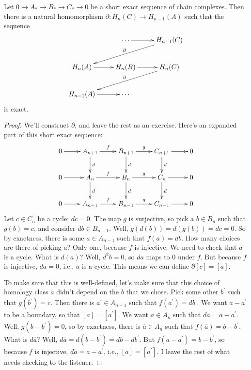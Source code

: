 \begin{theorem}
Let $0\to A_\ast\to B_\ast\to C_\ast\to 0$ be a short exact sequence of chain complexes. Then there is a natural homomorphism $\partial: H_n(C)\to H_{n-1}(A)$ such that the sequence 
\begin{equation*}
\xymatrix{ & \cdots \ar[r] & H_{n+1}(C) \ar[dll]_\partial \\
 H_n(A)\ar[r] & H_n(B)\ar[r] & H_n(C)\ar[dll]_\partial\\
 H_{n-1}(A)\ar[r] & \cdots & }
\end{equation*}
is exact.
\end{theorem}
\begin{proof}
We'll construct $\partial$, and leave the rest as an exercise. Here's an 
expanded part of this short exact sequence:
\begin{equation*}
\xymatrix{0\ar[r] & A_{n+1}\ar[r]^f\ar[d]^d & B_{n+1}\ar[r]^g\ar[d]^d & C_{n+1}\ar[r]\ar[d]^d & 0\\
0\ar[r] & A_n\ar[r]^f\ar[d]^d & B_n\ar[r]^g\ar[d]^d & C_n\ar[r]\ar[d]^d & 0\\
0\ar[r] & A_{n-1}\ar[r]^f & B_{n-1}\ar[r]^g & C_{n-1}\ar[r] & 0}
\end{equation*}
Let $c\in C_n$ be a cycle: $dc=0$. The map $g$ is surjective, so pick a $b\in B_n$ such that $g(b)=c$, and consider $db\in B_{n-1}$. Well, $g(d(b))=d(g(b))=dc=0$. So by exactness, there is some $a\in A_{n-1}$ such that $f(a)=db$. How many choices are there of picking $a$? Only one, because $f$ is injective. We need to check that $a$ is a cycle. What is $d(a)$? Well, $d^2b=0$, so $da$ maps to $0$ under $f$. But because $f$ is injective, $da=0$, i.e., $a$ is a cycle. This means we can define $\partial[c]=[a]$.

To make sure that this is well-defined, let's make sure that this choice of homology class $a$ didn't depend on the $b$ that we chose. Pick some other $b^\prime$ such that $g(b^\prime)=c$. Then there is $a^\prime\in A_{n-1}$ such that $f(a^\prime)=db^\prime$. We want $a-a^\prime$ to be a boundary, so that $[a]=[a^\prime]$. We want $\overline{a}\in A_n$ such that $d\overline{a}=a-a^\prime$. Well, $g(b-b^\prime)=0$, so by exactness, there is $\overline{a}\in A_n$ such that $f(\overline{a})=b-b^\prime$. What is $d\overline{a}$? Well, $d\overline{a}=d(b-b^\prime)=db-db^\prime$. But $f(a-a^\prime)=b-b^\prime$, so because $f$ is injective, $d\overline{a}=a-a^\prime$, i.e., $[a]=[a^\prime]$. 
I leave the rest of what needs checking to the listener. 
\end{proof}

